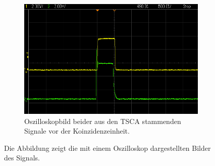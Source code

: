 \begin{figure}[H]
\begin{subfigure}[t]{0.495\textwidth}
		\centering
		\includegraphics[width=\textwidth]{img/BeideSignaleVorKoinzidenzeinheit}
		\caption{Oszilloskopbild beider aus den TSCA stammenden Signale vor der Koinzidenzeinheit.}
		\label{BeideSignaleVorKoinzidenzeinheit}
	\end{subfigure}
	\caption{Die Abbildung zeigt die mit einem Oszilloskop dargestellten Bilder des Signals.}
	\label{Oszilloskopbilder}
\end{figure}
\noindent 
